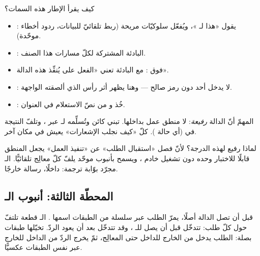 كيف يقرأ الإطار هذه السمات؟
\begin{itemize}
\item \code{[ApiController]}: يقول «هذا  لـ »، ويُفعّل سلوكيّات
  مريحة (ربط تلقائيّ للبيانات، ردود أخطاء موحّدة).
\item {}: البادئة المشتركة لكلّ مسارات هذا الصنف.
\item \code{[HttpGet]} فوق : مع البادئة تعني «الفعل  على
   يُنفِّذ هذه الدالة».
\item \code{[Authorize]}: لا يدخل أحد دون رمز صالح — وهنا يظهر أثر رأس 
  الذي ألصقته الواجهة.
\item \code{[FromQuery]}: خُذ  و من نصّ الاستعلام في العنوان.
\end{itemize}

المهمّ أنّ الدالة \emph{رفيعة}: لا منطق عمل بداخلها. تبني كائن 
وتُسلِّمه لـ  عبر ، وتلفّ النتيجة في 
(أي حالة ). كلّ «كيف نجلب الإشعارات» يعيش في مكان آخر.

\begin{why}
لماذا  رفيع لهذه الدرجة؟ لأنّ فصل «استقبال الطلب» عن «تنفيذ العمل»
يجعل المنطق قابلًا للاختبار وحده دون تشغيل خادم ، ويسمح بأنبوب موحّد يلفّ
كلّ معالِج تلقائيًّا. الـ  مجرّد بوّابة ترجمة:  داخلًا، رسالة
 خارجًا.
\end{why}

\subsection{المحطّة الثالثة: أنبوب الـ }

قبل أن تصل الدالة أصلًا، يمرّ الطلب عبر سلسلة من الطبقات اسمها .
الـ  قطعة تلتفّ حول كلّ طلب: تتدخّل قبل أن يصل للـ ،
وقد تتدخّل بعد أن يعود الردّ. تخيّلها طبقات بصلة: الطلب يدخل من الخارج للداخل حتى
المعالِج، ثمّ يخرج الردّ من الداخل للخارج عبر نفس الطبقات عكسيًّا.

